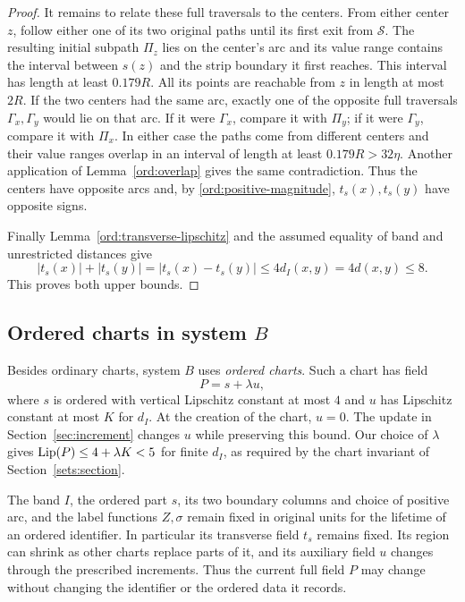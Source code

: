 \begin{proof}
It remains to relate these full traversals to the centers.
From either center $z$, follow either one of its two
original paths until its first exit from $\mathcal S$.
The resulting initial subpath $\Pi_z$ lies on the
center's arc and its value range contains the interval
between $s(z)$ and the strip boundary it first reaches.
This interval has length at least $0.179R$. All its
points are reachable from $z$ in length at most $2R$.
If the two centers had the same arc, exactly one of the opposite
full traversals $\Gamma_x,\Gamma_y$ would lie on that
arc. If it were $\Gamma_x$, compare it with $\Pi_y$; if
it were $\Gamma_y$, compare it with $\Pi_x$. In either case
the paths come from different centers and their value ranges overlap in
an interval
of length at least $0.179R>32\eta$. Another application
of Lemma~\ref{ord:overlap} gives the same contradiction.
Thus the centers have opposite arcs and, by
\eqref{ord:positive-magnitude}, $t_s(x),t_s(y)$ have
opposite signs.

Finally Lemma~\ref{ord:transverse-lipschitz} and the
assumed equality of band and unrestricted distances give
\[
 |t_s(x)|+|t_s(y)|
   =|t_s(x)-t_s(y)|
   \le4d_I(x,y)=4d(x,y)\le8.
\]
This proves both upper bounds.
\end{proof}


\subsection{Ordered charts in system \texorpdfstring{$B$}{B}}
\label{ord:charts}

Besides ordinary charts, system $B$ uses \emph{ordered charts}. Such a
chart has field
\[
 P=s+\lambda u,
\]
where $s$ is ordered with vertical Lipschitz constant at most $4$ and
$u$ has Lipschitz constant at most $K$ for $d_I$. At the creation of the
chart, $u=0$. The update in Section~\ref{sec:increment} changes $u$ while
preserving this bound. Our choice of $\lambda$ gives
$\operatorname{Lip}(P)\le4+\lambda K<5$ for finite $d_I$, as required by the chart
invariant of Section~\ref{sets:section}.

The band $I$, the ordered part $s$, its two boundary columns and choice
of positive arc, and the label functions $Z,\sigma$ remain fixed in original units for the
lifetime of an ordered identifier. In particular its transverse field
$t_s$ remains fixed. Its region can shrink as other charts replace parts
of it, and its auxiliary field $u$ changes through the prescribed
increments. Thus the current full field $P$ may change without changing
the identifier or the ordered data it records.
